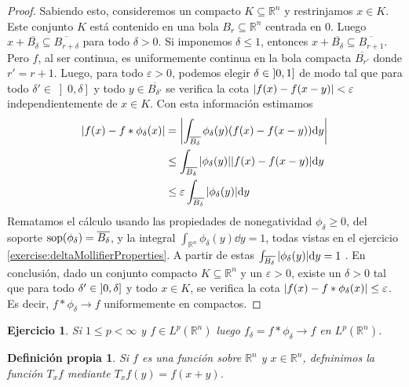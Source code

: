 \documentclass{article}
\newcommand{\realNumbers}{\mathbb{R}}
\newtheorem{myDefinition}{Definición propia}
\newtheorem{exercise}{Ejercicio}
\DeclareMathOperator{\support}{\textnormal{sop}}
\newcommand{\leftOpenInterval}{\left]}
\newcommand{\rightOpenInterval}{\right[}
\newcommand{\leftClosedInterval}{\left[}
\newcommand{\rightClosedInterval}{\right]}
\newcommand{\interval}[3]{%
  \ifstrequal{#1}{oo}{%
    \leftOpenInterval #2, #3 \rightOpenInterval%
  }{%
    \ifstrequal{#1}{co}{%
      \leftClosedInterval #2, #3 \rightOpenInterval%
    }{%
      \ifstrequal{#1}{oc}{
        \leftOpenInterval #2, #3 \rightClosedInterval%
      }{%
        \ifstrequal{#1}{cc}{
          \leftClosedInterval #2, #3 \rightClosedInterval
        }{%
        }%
      }%
    }%
  }%
}
\theoremstyle{remark}
\begin{document}
\begin{proof}
  Sabiendo esto, consideremos un compacto \(K \subseteq \realNumbers^n\) y restrinjamos \(x \in K\).
  Este conjunto \(K\) está contenido en una bola \(B_r \subseteq \realNumbers^n\) centrada en 0.
  Luego \(x + \overline{B_{\delta}} \subseteq \overline{B_{r + \delta}}\) para todo \(\delta > 0\).
  Si imponemos \(\delta \leq 1\), entonces \(x + \overline{B_{\delta}} \subseteq \overline{B_{r + 1}}\).
  Pero \(f\), al ser continua, es uniformemente continua en la bola compacta \(\overline{B_{r'}}\) donde \(r' = r + 1\).
  Luego, para todo \(\varepsilon > 0\), podemos elegir \(\delta \in \interval{oc}{0}{1}\) de modo tal que para todo \(\delta' \in \left]0, \delta \right]\) y todo \(y \in \overline{B_{\delta'}}\) se verifica la cota \(\abs{f(x) - f(x - y)} < \varepsilon\) independientemente de \(x \in K\).
  Con esta información estimamos
  \begin{align}
    \abs{
      f(x) - f * \phi_{\delta} (x)
    }
    &=
    \abs{
      \int_{\overline{B_{\delta}}} 
        \phi_{\delta}(y) (f(x) - f(x - y)) 
      \dd y
    }
    \\
    &\leq
    \int_{\overline{B_{\delta}}}
      \abs{\phi_{\delta}(y)} \abs{f(x) - f(x - y)}
    \dd y
    \\
    &\leq
    \varepsilon
    \int_{\overline{B_{\delta}}}
      \abs{\phi_{\delta}(y)}
    \dd y
  \end{align}
  Rematamos el cálculo usando las propiedades de nonegatividad \(\phi_{\delta} \geq 0\), del soporte \(\support(\phi_{\delta}) = \overline{B_{\delta}}\), y la integral \(\int_{\realNumbers^n} \phi_{\delta}(y) \dd y = 1\), todas vistas en el ejercicio \ref{exercise:deltaMollifierProperties}.
  A partir de estas 
  \(
    \int_{\overline{B_{\delta}}}
      \abs{\phi_{\delta}(y)}
    \dd y
    =
    1
  \)
  .
  En conclusión, dado un conjunto compacto \(K \subseteq \realNumbers^n\) y un \(\varepsilon > 0\), existe un \(\delta > 0\) tal que para todo \(\delta' \in \interval{oc}{0}{\delta}\) y todo \(x \in K\), se verifica la cota \(\abs{f(x) - f * \phi_{\delta}(x)} \leq \varepsilon\).
  Es decir, \(f * \phi_{\delta} \rightarrow f\) uniformemente en compactos.
\end{proof}

\begin{exercise}
  Si \(1 \leq p < \infty\) y \(f \in L^p(\realNumbers^n)\) luego \(f_{\delta} = f * \phi_{\delta} \rightarrow f\) en \(L^p(\realNumbers^n)\).
\end{exercise}

\begin{myDefinition}
  Si \(f\) es una función sobre \(\realNumbers^n\) y \(x \in \realNumbers^n\), defninimos la función \(T_x f\) mediante \(T_x f (y) = f(x + y)\).
\end{myDefinition}
\end{document}
